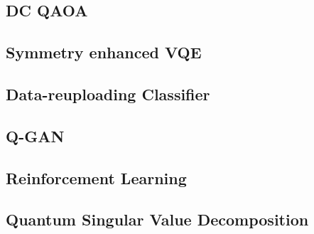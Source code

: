 \subsection{DC QAOA}


\subsection{Symmetry enhanced VQE}


\subsection{Data-reuploading Classifier}


\subsection{Q-GAN}


\subsection{Reinforcement Learning}


\subsection{Quantum Singular Value Decomposition}

